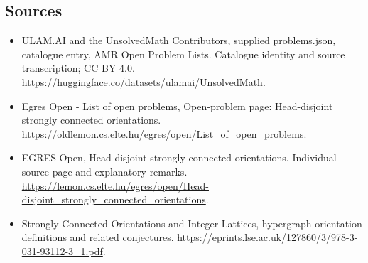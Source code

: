 \documentclass[11pt,a4paper]{article}
\begin{document}
\subsection{Sources}
\begin{itemize}
\item[S1] ULAM.AI and the UnsolvedMath Contributors, supplied problems.json, catalogue entry, AMR Open Problem Lists. Catalogue identity and source transcription; CC BY 4.0.
\url{https://huggingface.co/datasets/ulamai/UnsolvedMath}.
\item[S2] Egres Open - List of open problems, Open-problem page: Head-disjoint strongly connected orientations. 
\url{https://oldlemon.cs.elte.hu/egres/open/List_of_open_problems}.
\item[S3] EGRES Open, Head-disjoint strongly connected orientations. Individual source page and explanatory remarks.
\url{https://lemon.cs.elte.hu/egres/open/Head-disjoint_strongly_connected_orientations}.
\item[S4] Strongly Connected Orientations and Integer Lattices, hypergraph orientation definitions and related conjectures.
\url{https://eprints.lse.ac.uk/127860/3/978-3-031-93112-3_1.pdf}.
\end{itemize}
\end{document}
